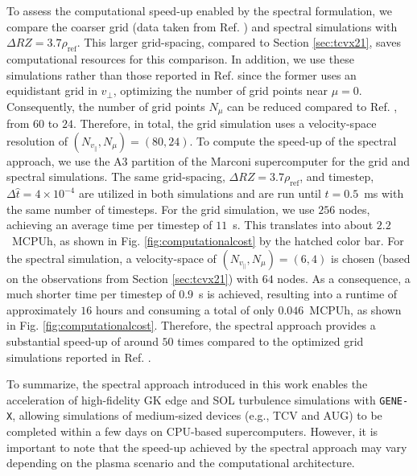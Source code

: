 \documentclass[preprint,12pt]{elsarticle}
\newcommand{\rhoref}{\rho_{\mathrm{ref}}}
\begin{document}
To assess the computational speed-up enabled by the spectral formulation, we compare the coarser grid (data taken from Ref. \cite{ulbl2023phd}) and spectral simulations with $\Delta RZ = 3.7 \rhoref$. This larger grid-spacing, compared to Section \ref{sec:tcvx21}, saves computational resources for this comparison. In addition, we use these simulations rather than those reported in Ref. \cite{ulbl2023} since the former uses an equidistant grid in $v_\perp$, optimizing the number of grid points near $ \mu = 0 $. Consequently, the number of grid points $ N_\mu $ can be reduced compared to Ref. \cite{ulbl2023}, from $60$ to $24$. Therefore, in total, the grid simulation uses a velocity-space resolution of $(N_{v_\parallel}, N_\mu) = (80,24)$. To compute the speed-up of the spectral approach, we use the A3 partition of the Marconi supercomputer for the grid and spectral simulations. The same grid-spacing, $\Delta RZ = 3.7 \rhoref $, and timestep, $ \Delta \hat{t} = 4 \times 10^{-4} $ are utilized in both simulations and are run until $ t = 0.5 $~ms with the same number of timesteps. For the grid simulation, we use $256$ nodes, achieving an average time per timestep of $11$~s. This translates into about $2.2$~MCPUh, as shown in Fig. \ref{fig:computationalcost} by the hatched color bar. For the spectral simulation, a velocity-space of $ (N_{v_\parallel}, N_\mu) = (6,4) $ is chosen (based on the observations from Section \ref{sec:tcvx21}) with $64$ nodes. As a consequence, a much shorter time per timestep of $0.9$~s is achieved, resulting into a runtime of approximately $16$ hours and consuming a total of only $0.046$~MCPUh, as shown in Fig. \ref{fig:computationalcost}. Therefore, the spectral approach provides a substantial speed-up of around $50$ times compared to the optimized grid simulations reported in Ref. \cite{ulbl2023phd}.

To summarize, the spectral approach introduced in this work enables the acceleration of high-fidelity GK edge and SOL turbulence simulations with \verb|GENE-X|, allowing simulations of medium-sized devices (e.g., TCV and AUG) to be completed within a few days on CPU-based supercomputers. However, it is important to note that the speed-up achieved by the spectral approach may vary depending on the plasma scenario and the computational architecture.

\end{document}
